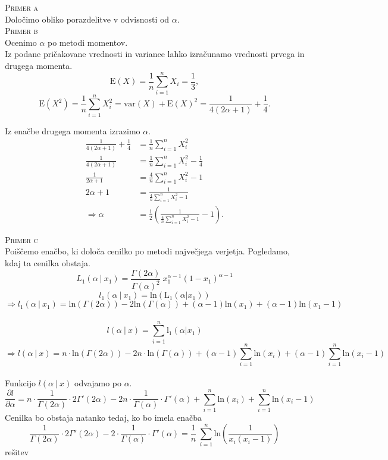 \documentclass[a4paper,12pt]{article}
\begin{document}
\noindent
\textsc{Primer a}
\\
Določimo obliko porazdelitve v odvisnosti od $\alpha$.
\\

\noindent
\textsc{Primer b}
\\
Ocenimo $\alpha$ po metodi momentov.
\\
Iz podane pričakovane vrednosti in variance lahko izračunamo vrednosti prvega in drugega momenta.
$$ \text{E}(X) = \frac{1}{n} \sum_{i = 1}^{n} X_i = \frac{1}{3}, $$
$$ \text{E}(X^2) = \frac{1}{n} \sum_{i = 1}^{n} X_i^2 = \text{var}(X) + \text{E}(X)^2 = \frac{1}{4(2 \alpha + 1)} + \frac{1}{4}. $$

Iz enačbe drugega momenta izrazimo $\alpha$.
\begin{align*}
    \frac{1}{4(2 \alpha + 1)} + \frac{1}{4} &= \frac{1}{n} \sum_{i = 1}^{n} X_i^2 
    \\
    \frac{1}{4(2 \alpha + 1)} &= \frac{1}{n} \sum_{i = 1}^{n} X_i^2 - \frac{1}{4} 
    \\
    \frac{1}{2 \alpha + 1} &= \frac{4}{n} \sum_{i = 1}^{n} X_i^2 - 1 
    \\
    2 \alpha + 1 &= \frac{1}{\frac{4}{n} \sum_{i = 1}^{n} X_i^2 - 1}
    \\
    \Rightarrow \alpha &= \frac{1}{2} \left( \frac{1}{\frac{4}{n} \sum_{i = 1}^{n} X_i^2 - 1} - 1 \right).
\end{align*}

\noindent
\textsc{Primer c}
\\
Poiščemo enačbo, ki določa cenilko po metodi največjega verjetja. Pogledamo, kdaj ta cenilka obstaja.
$$ L_1 (\alpha \ | \ x_1) = \frac{\Gamma (2 \alpha)}{\Gamma (\alpha)^2} \ x_1^{\alpha - 1} (1 - x_1)^{\alpha - 1} $$
$$ l_1 (\alpha \ | \ x_1) = \text{ln}(\text{L}_1 (\alpha | x_1)) $$
$$ \Rightarrow l_1 (\alpha \ | \ x_1) = \text{ln}(\Gamma (2 \alpha)) - 2 \text{ln} (\Gamma (\alpha)) + (\alpha - 1) \text{ln}(x_1) + (\alpha - 1) \text{ln}(x_1 - 1) $$
\\
$$ l (\alpha \ | \ x) = \sum_{i = 1}^{n} \text{l}_1 (\alpha | x_1) $$
$$ \Rightarrow l (\alpha \ | \ x) = n \cdot \text{ln}(\Gamma (2 \alpha)) - 2 n \cdot \text{ln}(\Gamma (\alpha)) + (\alpha - 1) \sum_{i = 1}^{n} \text{ln}(x_i) + (\alpha - 1) \sum_{i = 1}^{n} \text{ln} (x_i - 1)$$
\\
Funkcijo $ l (\alpha \ | \ x) $ odvajamo po $\alpha$.
$$ \frac{\partial l}{\partial \alpha} = n \cdot \frac{1}{\Gamma (2 \alpha)} \cdot 2 \Gamma' (2 \alpha) - 2n \cdot \frac{1}{\Gamma (\alpha)} \cdot \Gamma' (\alpha) + \sum_{i = 1}^{n} \text{ln}(x_i) + \sum_{i = 1}^{n} \text{ln}(x_i - 1)$$
Cenilka bo obstaja natanko tedaj, ko bo imela enačba
 $$ \frac{1}{\Gamma (2 \alpha)} \cdot 2 \Gamma' (2 \alpha) - 2 \cdot \frac{1}{\Gamma (\alpha)} \cdot \Gamma' (\alpha) = \frac{1}{n} \ \sum_{i = 1}^{n} \text{ln} \left( \frac{1}{x_i(x_i - 1)} \right) $$
rešitev
\end{document}
